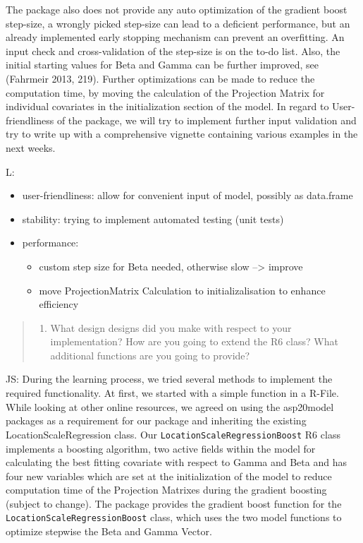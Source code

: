 \documentclass[
]{report}
\providecommand{\tightlist}{%
  \setlength{\itemsep}{0pt}\setlength{\parskip}{0pt}}
\begin{document}
The package also does not provide any auto optimization of the gradient
boost step-size, a wrongly picked step-size can lead to a deficient
performance, but an already implemented early stopping mechanism can
prevent an overfitting. An input check and cross-validation of the
step-size is on the to-do list. Also, the initial starting values for
Beta and Gamma can be further improved, see (Fahrmeir 2013, 219).
Further optimizations can be made to reduce the computation time, by
moving the calculation of the Projection Matrix for individual
covariates in the initialization section of the model. In regard to
User-friendliness of the package, we will try to implement further input
validation and try to write up with a comprehensive vignette containing
various examples in the next weeks.

L:

\begin{itemize}
\tightlist
\item
  user-friendliness: allow for convenient input of model, possibly as
  data.frame
\item
  stability: trying to implement automated testing (unit tests)
\item
  performance:

  \begin{itemize}
  \tightlist
  \item
    custom step size for Beta needed, otherwise slow --\textgreater{}
    improve
  \item
    move ProjectionMatrix Calculation to initializalisation to enhance
    efficiency
  \end{itemize}
\end{itemize}

\begin{quote}
\begin{enumerate}
\def\labelenumi{\arabic{enumi}.}
\setcounter{enumi}{1}
\tightlist
\item
  What design designs did you make with respect to your implementation?
  How are you going to extend the R6 class? What additional functions
  are you going to provide?
\end{enumerate}
\end{quote}

JS: During the learning process, we tried several methods to implement
the required functionality. At first, we started with a simple function
in a R-File. While looking at other online resources, we agreed on using
the asp20model packages as a requirement for our package and inheriting
the existing LocationScaleRegression class. Our
\texttt{LocationScaleRegressionBoost} R6 class implements a boosting
algorithm, two active fields within the model for calculating the best
fitting covariate with respect to Gamma and Beta and has four new
variables which are set at the initialization of the model to reduce
computation time of the Projection Matrixes during the gradient boosting
(subject to change). The package provides the gradient boost function
for the \texttt{LocationScaleRegressionBoost} class, which uses the two
model functions to optimize stepwise the Beta and Gamma Vector.
\end{document}
